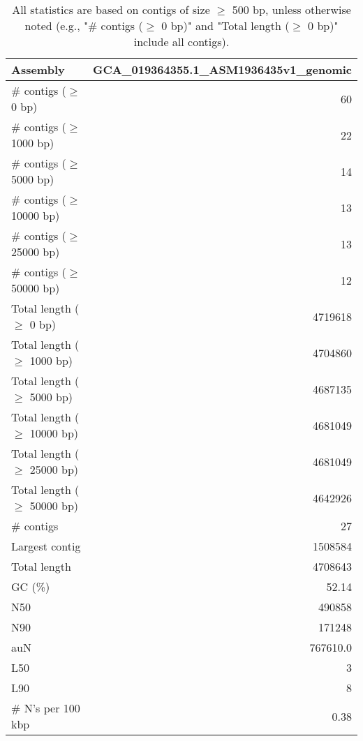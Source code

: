 \documentclass[12pt,a4paper]{article}
\begin{document}
\begin{table}[ht]
\begin{center}
\caption{All statistics are based on contigs of size $\geq$ 500 bp, unless otherwise noted (e.g., "\# contigs ($\geq$ 0 bp)" and "Total length ($\geq$ 0 bp)" include all contigs).}
\begin{tabular}{|l*{1}{|r}|}
\hline
Assembly & GCA\_019364355.1\_ASM1936435v1\_genomic \\ \hline
\# contigs ($\geq$ 0 bp) & 60 \\ \hline
\# contigs ($\geq$ 1000 bp) & 22 \\ \hline
\# contigs ($\geq$ 5000 bp) & 14 \\ \hline
\# contigs ($\geq$ 10000 bp) & 13 \\ \hline
\# contigs ($\geq$ 25000 bp) & 13 \\ \hline
\# contigs ($\geq$ 50000 bp) & 12 \\ \hline
Total length ($\geq$ 0 bp) & 4719618 \\ \hline
Total length ($\geq$ 1000 bp) & 4704860 \\ \hline
Total length ($\geq$ 5000 bp) & 4687135 \\ \hline
Total length ($\geq$ 10000 bp) & 4681049 \\ \hline
Total length ($\geq$ 25000 bp) & 4681049 \\ \hline
Total length ($\geq$ 50000 bp) & 4642926 \\ \hline
\# contigs & 27 \\ \hline
Largest contig & 1508584 \\ \hline
Total length & 4708643 \\ \hline
GC (\%) & 52.14 \\ \hline
N50 & 490858 \\ \hline
N90 & 171248 \\ \hline
auN & 767610.0 \\ \hline
L50 & 3 \\ \hline
L90 & 8 \\ \hline
\# N's per 100 kbp & 0.38 \\ \hline
\end{tabular}
\end{center}
\end{table}
\end{document}

